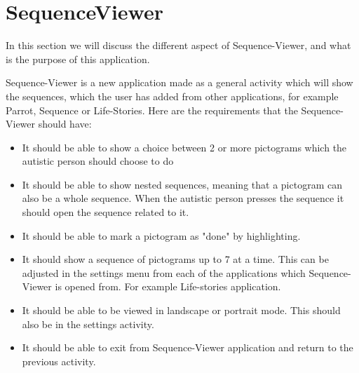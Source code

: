 \section{SequenceViewer}\label{sec:sequenceviewer}

In this section we will discuss the different aspect of Sequence-Viewer, and what is the purpose of this application.

Sequence-Viewer is a new application made as a general activity which will show the sequences, which the user has added from other applications, for example Parrot, Sequence or Life-Stories.
Here are the requirements that the Sequence-Viewer should have:
\begin{itemize}
\item It should be able to show a choice between 2 or more pictograms which the autistic person should choose to do
\item It should be able to show nested sequences, meaning that a pictogram can also be a whole sequence. When the autistic person presses the sequence it should open the sequence related to it.
\item It should be able to mark a pictogram as "done" by highlighting.
\item It should show a sequence of pictograms up to 7 at a time. This can be adjusted in the settings menu from each of the applications which Sequence-Viewer is opened from. For example Life-stories application.
\item It should be able to be viewed in landscape or portrait mode. This should also be in the settings activity.
\item It should be able to exit from Sequence-Viewer application and return to the previous activity.
\end{itemize}
